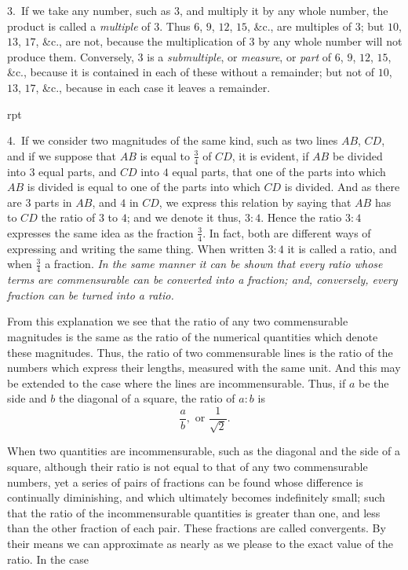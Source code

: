 \documentclass[oneside]{book}
\newcounter{wrapwidth}
\newcommand\imgflow[3]{
\setcounter{wrapwidth}{#1}

\begin{wrapfigure}[#2]{r}{\value{wrapwidth}pt}
\begin{center}
\vspace{-0.3in}

\end{center}
\end{wrapfigure}
}
\begin{document}
\begin{footnotesize}
3.~If we take any number, such as $3$, and multiply it by any
whole number, the product is called a \emph{multiple} of $3$. Thus $6$, $9$,
$12$, $15$, \&c., are multiples of $3$; but $10$, $13$, $17$, \&c., are not, because
the multiplication of $3$ by any whole number will not produce
them. Conversely, $3$ is a \emph{submultiple}, or \emph{measure}, or \emph{part}
of $6$, $9$, $12$, $15$, \&c., because it is contained in each of these without
a remainder; but not of $10$, $13$, $17$, \&c., because in each case
it leaves a remainder.


\imgflow{150}{6}{f257}

4.~If we consider two magnitudes of the same kind, such as
two lines $AB$, $CD$, and if we suppose that $AB$ is equal to $\frac{3}{4}$ of
$CD$, it is evident, if $AB$ be divided into $3$ equal parts, and $CD$ into
$4$ equal parts, that one of the
parts into which $AB$ is divided
is equal to one of the parts into
which $CD$ is divided. And as
there are $3$ parts in $AB$, and $4$
in $CD$, we express this relation
by saying that $AB$ has to
$CD$ the ratio of $3$ to $4$; and we denote it thus, $3:4$. Hence the
ratio $3:4$ expresses the same idea as the fraction $\frac{3}{4}$. In fact,
both are different ways of expressing and writing the same thing.
When written $3:4$ it is called a ratio, and when $\frac{3}{4}$ a fraction.
\emph{In the same manner it can be shown that every ratio whose terms
are commensurable can be converted into a fraction; and, conversely,
every fraction can be turned into a ratio.}\par\smallskip

From this explanation we see that the ratio of any two commensurable
magnitudes is the same as the ratio of the numerical
quantities which denote these magnitudes. Thus, the ratio of
two commensurable lines is the ratio of the numbers which express
their lengths, measured with the same unit. And this may
be extended to the case where the lines are incommensurable.
Thus, if $a$ be the side and $b$ the diagonal of a square, the ratio
of $a:b$ is
\[
\frac{a}{b}, \text{\ or } \frac{1}{\sqrt{2}}.
\]

When two quantities are incommensurable, such as the diagonal
and the side of a square, although their ratio is not equal to
that of any two commensurable numbers, yet a series of pairs of
fractions can be found whose difference is continually diminishing,
and which ultimately becomes indefinitely small; such that
the ratio of the incommensurable quantities is greater than one,
and less than the other fraction of each pair. These fractions
are called convergents. By their means we can approximate as
nearly as we please to the exact value of the ratio. In the case


\end{footnotesize}
\end{document}
